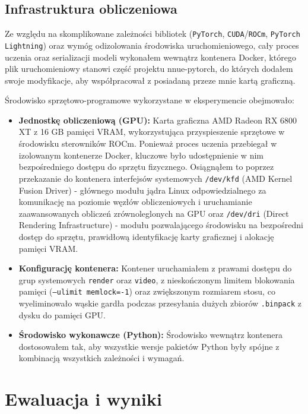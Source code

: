 \documentclass[12pt,a4paper]{report}
\begin{document}
\section{Infrastruktura obliczeniowa}

Ze względu na skomplikowane zależności bibliotek (\texttt{PyTorch}, \texttt{CUDA}/\texttt{ROCm}, \texttt{PyTorch Lightning}) oraz wymóg odizolowania środowiska uruchomieniowego, cały proces uczenia oraz serializacji modeli wykonałem wewnątrz kontenera Docker, którego plik uruchomieniowy stanowi część projektu nnue-pytorch, do których dodałem swoje modyfikacje, aby współpracował z posiadaną przeze mnie kartą graficzną.

Środowisko sprzętowo-programowe wykorzystane w eksperymencie obejmowało:

\begin{itemize}
    \item \textbf{Jednostkę obliczeniową (GPU):} Karta graficzna AMD Radeon RX 6800 XT z 16 GB pamięci VRAM, wykorzystująca przyspieszenie sprzętowe w środowisku sterowników ROCm. Ponieważ proces uczenia przebiegał w izolowanym kontenerze Docker, kluczowe było udostępnienie w nim bezpośredniego dostępu do sprzętu fizycznego. Osiągnąłem to poprzez przekazanie do kontenera interfejsów systemowych \texttt{/dev/kfd} (AMD Kernel Fusion Driver) - głównego modułu jądra Linux odpowiedzialnego za komunikację na poziomie węzłów obliczeniowych i uruchamianie zaawansowanych obliczeń zrównoleglonych na GPU oraz \texttt{/dev/dri} (Direct Rendering Infrastructure) - modułu pozwalającego środowisku na bezpośredni dostęp do sprzętu, prawidłową identyfikację karty graficznej i alokację pamięci VRAM.
    \item \textbf{Konfigurację kontenera:} Kontener uruchamiałem z prawami dostępu do grup systemowych \texttt{render} oraz \texttt{video}, z nieskończonym limitem blokowania pamięci (\texttt{--ulimit memlock=-1}) oraz zwiększonym rozmiarem stosu, co wyeliminowało wąskie gardła podczas przesyłania dużych zbiorów \texttt{.binpack} z dysku do pamięci GPU.
    \item \textbf{Środowisko wykonawcze (Python):} Środowisko wewnątrz kontenera dostosowałem tak, aby wszystkie wersje pakietów Python były spójne z kombinacją wszystkich zależności i wymagań.
\end{itemize}

\chapter{Ewaluacja i wyniki}
\end{document}
